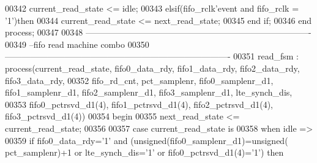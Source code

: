 \begin{DoxyCode}
00342         \textcolor{vhdlchar}{current_read_state} \textcolor{vhdlchar}{<=} \textcolor{vhdlchar}{idle};
00343     \textcolor{keywordflow}{elsif}\textcolor{vhdlchar}{(}\textcolor{vhdlchar}{fifo_rclk}\textcolor{vhdlchar}{'}\textcolor{vhdlkeyword}{event} \textcolor{keywordflow}{and} \textcolor{vhdlchar}{fifo_rclk} \textcolor{vhdlchar}{=} \textcolor{vhdlchar}{'}\textcolor{vhdllogic}{}\textcolor{vhdllogic}{1}\textcolor{vhdlchar}{'}\textcolor{vhdlchar}{)}\textcolor{keywordflow}{then} 
00344         \textcolor{vhdlchar}{current_read_state} \textcolor{vhdlchar}{<=} \textcolor{vhdlchar}{next_read_state};
00345     \textcolor{keywordflow}{end} \textcolor{keywordflow}{if}; 
00346 \textcolor{keywordflow}{end} \textcolor{keywordflow}{process};
00347 
00348 \textcolor{keyword}{-------------------------------------------------------------------------------}
00349 \textcolor{keyword}{--fifo read machine combo}
00350 \textcolor{keyword}{-------------------------------------------------------------------------------}
00351 read\_fsm : \textcolor{keywordflow}{process}(current_read_state, fifo0_data_rdy, fifo1_data_rdy, 
      fifo2_data_rdy, fifo3_data_rdy,
00352                             fifo_rd_cnt, pct_samplenr, fifo0_samplenr_d1, 
      fifo1_samplenr_d1, fifo2_samplenr_d1, fifo3_samplenr_d1, lte_synch_dis,
00353                             fifo0_pctrsvd_d1(\textcolor{vhdllogic}{4}), fifo1_pctrsvd_d1(\textcolor{vhdllogic}{4}), 
      fifo2_pctrsvd_d1(\textcolor{vhdllogic}{4}), fifo3_pctrsvd_d1(\textcolor{vhdllogic}{4})) 
00354 \textcolor{vhdlkeyword}{begin}
00355     \textcolor{vhdlchar}{next_read_state} \textcolor{vhdlchar}{<=} \textcolor{vhdlchar}{current_read_state};
00356     
00357     \textcolor{keywordflow}{case} \textcolor{vhdlchar}{current_read_state} \textcolor{keywordflow}{is}
00358       \textcolor{keywordflow}{when} \textcolor{vhdlchar}{idle} \textcolor{vhdlchar}{=}\textcolor{vhdlchar}{>}
00359         \textcolor{keywordflow}{if} \textcolor{vhdlchar}{fifo0_data_rdy}\textcolor{vhdlchar}{=}\textcolor{vhdlchar}{'}\textcolor{vhdllogic}{}\textcolor{vhdllogic}{1}\textcolor{vhdlchar}{'}  \textcolor{keywordflow}{and} \textcolor{vhdlchar}{(}\textcolor{comment}{unsigned}\textcolor{vhdlchar}{(}\textcolor{vhdlchar}{fifo0_samplenr_d1}\textcolor{vhdlchar}{)}\textcolor{vhdlchar}{=}\textcolor{comment}{unsigned}\textcolor{vhdlchar}{(}\textcolor{vhdlchar}{
      pct_samplenr}\textcolor{vhdlchar}{)}\textcolor{vhdlchar}{+}\textcolor{vhdllogic}{}\textcolor{vhdllogic}{1} \textcolor{keywordflow}{or} \textcolor{vhdlchar}{lte_synch_dis}\textcolor{vhdlchar}{=}\textcolor{vhdlchar}{'}\textcolor{vhdllogic}{}\textcolor{vhdllogic}{1}\textcolor{vhdlchar}{'} \textcolor{keywordflow}{or} \textcolor{vhdlchar}{fifo0_pctrsvd_d1}\textcolor{vhdlchar}{(}\textcolor{vhdllogic}{}\textcolor{vhdllogic}{4}\textcolor{vhdlchar}{)}\textcolor{vhdlchar}{=}\textcolor{vhdlchar}{'}\textcolor{vhdllogic}{}\textcolor{vhdllogic}{1}\textcolor{vhdlchar}{'}\textcolor{vhdlchar}{)} \textcolor{keywordflow}{then} 

\end{DoxyCode}

